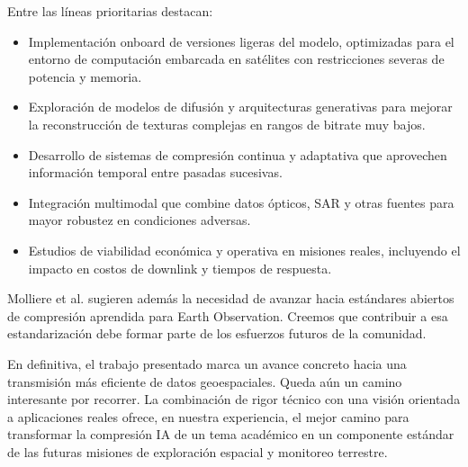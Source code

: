 Entre las líneas prioritarias destacan:

\begin{itemize}
    \item Implementación onboard de versiones ligeras del modelo, optimizadas para el entorno de computación embarcada en satélites con restricciones severas de potencia y memoria.
    \item Exploración de modelos de difusión y arquitecturas generativas para mejorar la reconstrucción de texturas complejas en rangos de bitrate muy bajos.
    \item Desarrollo de sistemas de compresión continua y adaptativa que aprovechen información temporal entre pasadas sucesivas.
    \item Integración multimodal que combine datos ópticos, SAR y otras fuentes para mayor robustez en condiciones adversas.
    \item Estudios de viabilidad económica y operativa en misiones reales, incluyendo el impacto en costos de downlink y tiempos de respuesta.
\end{itemize}

Molliere et al. \cite{Molliere2025_Learned_EO_Compression} sugieren además la necesidad de avanzar hacia estándares abiertos de compresión aprendida para Earth Observation. Creemos que contribuir a esa estandarización debe formar parte de los esfuerzos futuros de la comunidad.

En definitiva, el trabajo presentado marca un avance concreto hacia una transmisión más eficiente de datos geoespaciales. Queda aún un camino interesante por recorrer. La combinación de rigor técnico con una visión orientada a aplicaciones reales ofrece, en nuestra experiencia, el mejor camino para transformar la compresión IA de un tema académico en un componente estándar de las futuras misiones de exploración espacial y monitoreo terrestre.